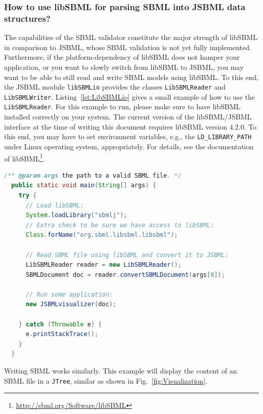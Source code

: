 \subsubsection{How to use libSBML for parsing SBML into JSBML data structures?}

The capabilities of the SBML validator constitute the
major strength of libSBML \citep{Bornstein2008} in comparison to JSBML, whose
SBML validation is not yet fully implemented. Furthermore, if the
platform-dependency of libSBML does not hamper your application, or you want to
slowly switch from libSBML to JSBML, you may want to be able to still read and
write SBML models using libSBML. To this end, the JSBML module
\texttt{libSBMLio} provides the classes \texttt{LibSBMLReader}
%
and \texttt{LibSBMLWriter}.
%
Listing~\vref{lst:LibSBMLio} gives a small example of how to use the
\texttt{LibSBMLReader}. For this example to run, please make sure to have
libSBML installed correctly on your system. The current version of the
libSBML/JSBML interface at the time of writing this document requires libSBML
version 4.2.0.
%
To this end, you may have to set environment variables, e.g., the
\texttt{LD\_LIBRARY\_PATH}
%
under Linux operating system, appropriately. For
details, see the documentation of
libSBML\footnote{\url{http://sbml.org/Software/libSBML}}.
\begin{lstlisting}[language=Java,float,caption={A simple example for
converting libSBML data structures into JSBML data objects},label=lst:LibSBMLio]
  /** @param args the path to a valid SBML file. */
  public static void main(String[] args) {
    try {
      // Load libSBML:
      System.loadLibrary("sbmlj");
      // Extra check to be sure we have access to libSBML:
      Class.forName("org.sbml.libsbml.libsbml");

      // Read SBML file using libSBML and convert it to JSBML:
      LibSBMLReader reader = new LibSBMLReader();
      SBMLDocument doc = reader.convertSBMLDocument(args[0]);

      // Run some application:
      new JSBMLvisualizer(doc);

    } catch (Throwable e) {
      e.printStackTrace();
    }
  }
\end{lstlisting}
Writing SBML works similarly. This example will display the content of an SBML
file in a \texttt{JTree}, similar as shown in Fig.~\vref{fig:Visualization}.

